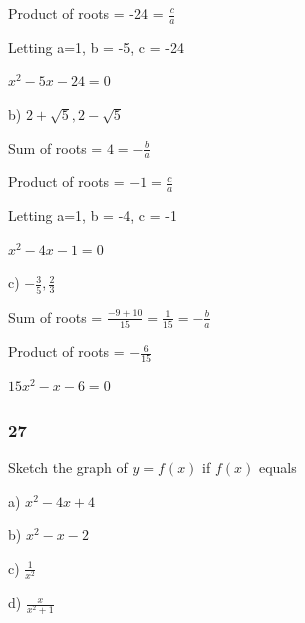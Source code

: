 \documentclass[]{report}
\begin{document}
Product of roots = -24 = $\frac{c}{a}$

Letting a=1, b = -5, c = -24

$x^2- 5x -24 = 0$

b) $2 + \sqrt{5}, 2 - \sqrt{5}$

Sum of roots = $4 = -\frac{b}{a}$

Product of roots = $-1 = \frac{c}{a}$

Letting a=1, b = -4, c = -1

$x^2 - 4x -1 = 0$

c) $-\frac{3}{5}, \frac{2}{3}$

Sum of roots = $ \frac{-9 + 10}{15} = \frac{1}{15} = -\frac{b}{a}$

Product of roots = $-\frac{6}{15}$

$15x^2 - x - 6 = 0$

\subsubsection{27}

Sketch the graph of $ y = f(x)$ if $f(x)$ equals

a) $x^2 -4x + 4$


b) $x^2 - x - 2$


c) $\frac{1}{x^2}$



d) $\frac{x}{x^2 + 1}$

\end{document}
